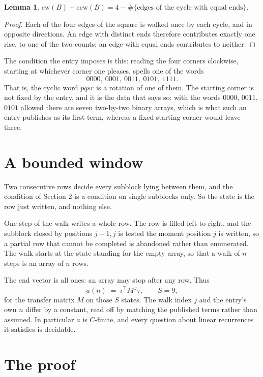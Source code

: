\documentclass[11pt,a4paper]{article}
\theoremstyle{plain}
\newtheorem{lemma}[theorem]{Lemma}
\theoremstyle{definition}
\begin{document}
\begin{lemma}\label{lem:sum}
$\mathrm{cw}(B)+\mathrm{ccw}(B)=4-\#\{\text{edges of the cycle with equal ends}\}$.
\end{lemma}

\begin{proof}
Each of the four edges of the square is walked once by each cycle, and in opposite directions.
An edge with distinct ends therefore contributes exactly one rise, to one of the two counts;
an edge with equal ends contributes to neither.
\end{proof}

The condition the entry imposes is this: reading the four corners clockwise, starting at whichever corner one pleases, spells one of the words
\[
0000,\ 0001,\ 0011,\ 0101,\ 1111.
\]
That is, the cyclic word $pqsr$ is a rotation of one of them. The starting corner is not fixed by the entry, and it is the data that says so: with the words $0000$, $0011$, $0101$ allowed there are seven two-by-two binary arrays, which is what such an entry publishes as its first term, whereas a fixed starting corner would leave three.

\section{A bounded window}

Two consecutive rows decide every subblock lying between them, and the condition of Section 2 is a condition on single subblocks only. So the state is the row just written, and nothing else.

One step of the walk writes a whole row. The row is filled left to right, and the subblock
closed by positions $j-1,j$ is tested the moment position $j$ is written, so a partial row that
cannot be completed is abandoned rather than enumerated. The walk starts at the state standing
for the empty array, so that a walk of $n$ steps is an array of $n$ rows.

The end vector is all ones: an array may stop after any row. Thus
\[
a(n)\;=\;\iota^{\!\top}M^{\,j}\tau ,\qquad S=9,
\]
for the transfer matrix $M$ on those $S$ states. The walk index $j$ and the entry's own $n$
differ by a constant, read off by matching the published terms rather than assumed. In
particular $a$ is $C$-finite, and every question about linear recurrences it satisfies is
decidable.

\section{The proof}
\end{document}
